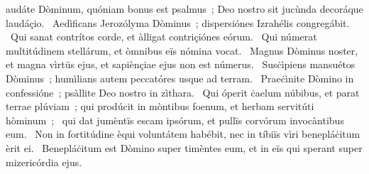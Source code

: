 \psalmChapterWithInscription{}
{ }
{%
audáte Dòminum, quóniam bonus est psalmus~; Deo nostro sit jucùnda decoráque laudáçio. 
~Aedìficans Jerozólyma Dòminus~; dispersiónes Izrahélis congregábit. 
~Qui sanat contrítos corde, et àlligat contriçiónes eórum. 
~Qui númerat multitúdinem stellárum, et òmnibus eïs nómina vocat. 
~Magnus Dòminus noster, et magna vìrtüs ejus, et sapiènçiae ejus non est númerus. 
~Susċìpiens mansuétos Dòminus~; humìlians autem peccatóres usque ad terram. 
~Praeċìnite Dòmino in confessióne~; psàllite Deo nostro in zìthara. 
~Qui óperit ċaelum núbibus, et parat terrae plúviam~; qui prodúcit in mòntibus foenum, et herbam servitúti hòminum~; 
~qui dat jumèntïs escam ipsórum, et pullïs corvórum invocàntibus eum. 
~Non in fortitúdine èqui voluntátem habébit, nec in tíbiïs vìri benepláċitum èrit ei. 
~Benepláċitum est Dòmino super timèntes eum, et in eïs qui sperant super mizericórdia ejus. 
}
